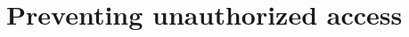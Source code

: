 \documentclass[../main.tex]{subfiles}
\begin{document}
\chapter{Preventing unauthorized access}
\end{document}
